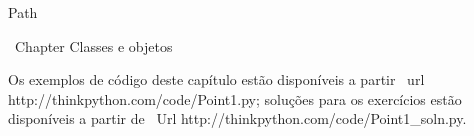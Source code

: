 \documentclass[10pt]{book}
\begin{document}
\begin {itemize}
{{{{{{{{{{{%

%







Path%




\ Chapter {Classes e objetos}

Os exemplos de código deste capítulo estão disponíveis a partir
\ url {http://thinkpython.com/code/Point1.py}; soluções
para os exercícios estão disponíveis a partir de
\ Url {http://thinkpython.com/code/Point1_soln.py}.


}}}}}}}}}}}
\end{itemize}
\end{document}
